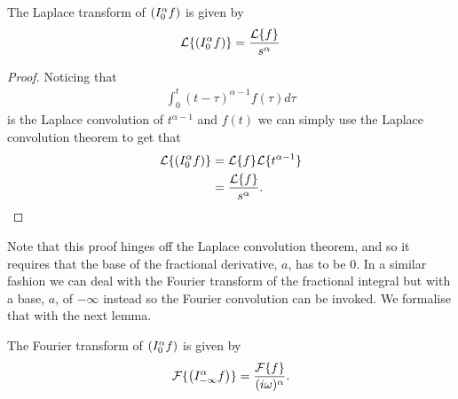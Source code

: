 \begin{mdframed}[innertopmargin=10pt]
\begin{lemma}
    \label{lem:rli_laplace}
    The Laplace transform of $ \left( I_{0}^{\alpha} f \right) $ is given by
    \begin{align}
        \mathcal{L}\{ \left( I_{0}^{\alpha} f \right) \} = \frac{\mathcal{L}\{f\}}{s^\alpha}
    \end{align}
\end{lemma}
\end{mdframed}
\begin{proof}
    Noticing that 
    \begin{align}
        \int_0^t (t - \tau)^{\alpha - 1} f(\tau) d\tau 
    \end{align}
    is the Laplace convolution of $ t^{\alpha - 1} $ and $ f(t) $ we can simply use the Laplace convolution theorem
    to get that
    \begin{align}
        \mathcal{L}\{ \left( I_{0}^{\alpha} f \right) \} &= \mathcal{L}\{f\} \mathcal{L}\{ t^{\alpha - 1} \} \\
            &= \frac{\mathcal{L}\{f\}}{s^\alpha}.
    \end{align}
\end{proof}
Note that this proof hinges off the Laplace convolution theorem, and so it requires that the base of the fractional derivative, $ a $, has to be $ 0 $. In a similar fashion we can deal with the Fourier transform of the fractional integral but with a base, $ a $, of $ -\infty $ instead so the Fourier convolution can be invoked. We formalise that with the next lemma.
\begin{mdframed}[innertopmargin=10pt]
\begin{lemma}
    \label{lem:rli_fourier}
    The Fourier transform of $ \left( I_{0}^{\alpha} f \right) $ is given by
    \begin{align}
        \mathcal{F}\{ \left( I_{-\infty}^{\alpha} f \right) \} = \frac{\mathcal{F}\{f\}}{(i\omega)^\alpha}.
    \end{align}
\end{lemma}
\end{mdframed}
